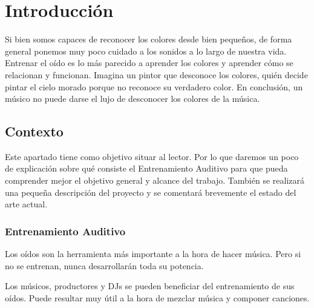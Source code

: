 \documentclass[12pt,twoside,titlepage]{report}
\begin{document}

   


\chapter{Introducción}

Si bien somos capaces de reconocer los colores desde bien pequeños, de forma general ponemos muy poco cuidado a los sonidos a lo largo de nuestra vida. Entrenar el oído es lo más parecido a aprender los colores y aprender cómo se relacionan y funcionan. Imagina un pintor que desconoce los colores, quién decide pintar el cielo morado porque no reconoce su verdadero color. En conclusión, un músico no puede darse el lujo de desconocer los colores de la música.

\pagestyle{fancy}

\setlength{\parskip}{0.75em}
\renewcommand{\baselinestretch}{1.25}


\setcounter{page}{1}

\section{Contexto}

Este apartado tiene como objetivo situar al lector. Por lo que daremos un poco de explicación sobre qué consiste el Entrenamiento Auditivo para que pueda comprender mejor el objetivo general y alcance del trabajo. También se realizará una pequeña descripción del proyecto y se comentará brevemente el estado del arte actual.

\subsection{Entrenamiento Auditivo}

Los oídos son la herramienta más importante a la hora de hacer música. Pero si no se entrenan, nunca desarrollarán toda su potencia.

Los músicos, productores y DJs se pueden beneficiar del entrenamiento de sus oídos. Puede resultar muy útil a la hora de mezclar música y componer canciones.
\end{document}

